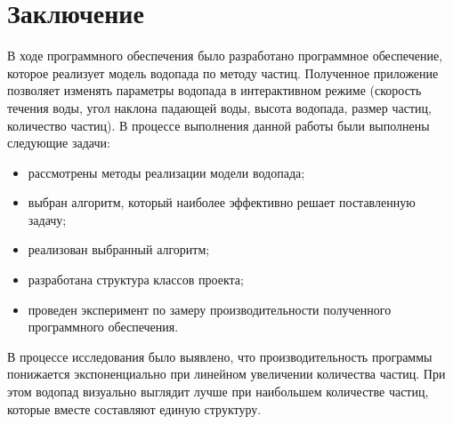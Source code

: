 \chapter*{Заключение}

В ходе программного обеспечения было разработано программное обеспечение, которое реализует модель водопада по методу частиц. Полученное приложение позволяет изменять параметры водопада в интерактивном режиме (скорость течения воды, угол наклона падающей воды, высота водопада, размер частиц, количество частиц). В процессе выполнения данной работы были выполнены следующие задачи:

\begin{itemize}
    \item рассмотрены методы реализации модели водопада;
    \item выбран алгоритм, который наиболее эффективно решает поставленную задачу;
    \item реализован выбранный алгоритм;
    \item разработана структура классов проекта;
    \item проведен эксперимент по замеру производительности полученного программного обеспечения.
\end{itemize}

В процессе исследования было выявлено, что производительность программы понижается экспоненциально при линейном увеличении количества частиц. При этом водопад визуально выглядит лучше при наибольшем количестве частиц, которые вместе составляют единую структуру.

